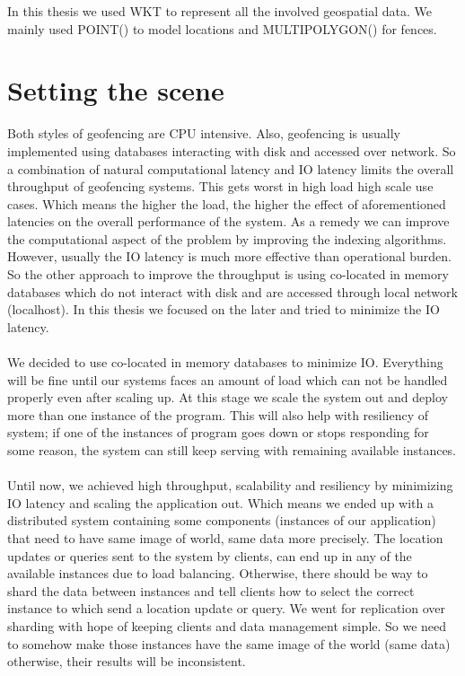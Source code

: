 \documentclass[a4]{report}
\begin{document}
    In this thesis we used WKT to represent all the involved geospatial data.
    We mainly used POINT() to model locations and MULTIPOLYGON() for fences.


    \section{Setting the scene}
    Both styles of geofencing are CPU intensive.
    Also, geofencing is usually implemented using databases interacting with disk and accessed over network.
    So a combination of natural computational latency and IO latency limits the overall throughput of geofencing systems.
    This gets worst in high load high scale use cases.
    Which means the higher the load, the higher the effect of aforementioned latencies on the overall performance
    of the system.
    As a remedy we can improve the computational aspect of the problem by improving the indexing algorithms.
    However, usually the IO latency is much more effective than operational burden.
    So the other approach to improve the throughput is using co-located in memory databases which do not interact
    with disk and are accessed through local network (localhost).
    In this thesis we focused on the later and tried to minimize the IO latency.

    \paragraph{}
    We decided to use co-located in memory databases to minimize IO.
    Everything will be fine until our systems faces an amount of load which can not be handled properly even after scaling up.
    At this stage we scale the system out and deploy more than one instance of the program.
    This will also help with resiliency of system;
    if one of the instances of program goes down or stops responding for some reason, the system can still keep
    serving with remaining available instances.

    \paragraph{}
    Until now, we achieved high throughput, scalability and resiliency by minimizing IO latency and scaling the
    application out.
    Which means we ended up with a distributed system containing some components (instances of our application) that
    need to have same image of world, same data more precisely.
    The location updates or queries sent to the system by clients, can end up in any of the available instances due
    to load balancing.
    Otherwise, there should be way to shard the data between instances and tell clients how to select the correct
    instance to which send a location update or query.
    We went for replication over sharding with hope of keeping clients and data management simple.
    So we need to somehow make those instances have the same image of the world (same data) otherwise, their results
    will be inconsistent.
\end{document}
